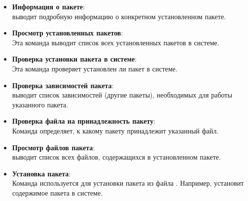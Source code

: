 \begin{itemize}
	\item \textbf{Информация о пакете}: \\
	 выводит подробную информацию о конкретном установленном пакете.
	
	
	\item \textbf{Просмотр установленных пакетов}: \\
	Эта команда выводит список всех установленных пакетов в системе.
	
	
	\item \textbf{Проверка установки пакета в системе}: \\
	Эта команда проверяет установлен ли пакет в системе.
	
	\item \textbf{Проверка зависимостей пакета}: \\
	  выводит список зависимостей (другие пакеты), необходимых для работы указанного пакета.
	 
	 
	\item \textbf{Проверка файла на принадлежность пакету}: \\
	Команда  определяет, к какому пакету принадлежит указанный файл.
	
	
	\item \textbf{Просмотр файлов пакета}: \\
	  выводит список всех файлов, содержащихся в установленном пакете.
	 
	\item \textbf{Установка пакета}: \\
	Команда  используется для установки пакета из файла . Например,  установит содержимое пакета в системе.
	

\end{itemize}
